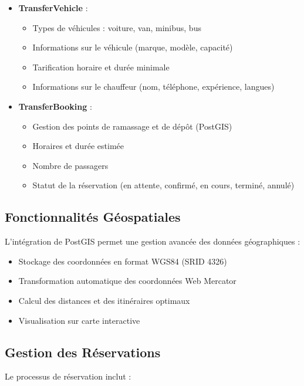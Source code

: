 \begin{itemize}
    \item \textbf{TransferVehicle} :
    \begin{itemize}
        \item Types de véhicules : voiture, van, minibus, bus
        \item Informations sur le véhicule (marque, modèle, capacité)
        \item Tarification horaire et durée minimale
        \item Informations sur le chauffeur (nom, téléphone, expérience, langues)
    \end{itemize}
    
    \item \textbf{TransferBooking} :
    \begin{itemize}
        \item Gestion des points de ramassage et de dépôt (PostGIS)
        \item Horaires et durée estimée
        \item Nombre de passagers
        \item Statut de la réservation (en attente, confirmé, en cours, terminé, annulé)
    \end{itemize}
\end{itemize}

\subsection{Fonctionnalités Géospatiales}
L'intégration de PostGIS permet une gestion avancée des données géographiques :

\begin{itemize}
    \item Stockage des coordonnées en format WGS84 (SRID 4326)
    \item Transformation automatique des coordonnées Web Mercator
    \item Calcul des distances et des itinéraires optimaux
    \item Visualisation sur carte interactive
\end{itemize}

\subsection{Gestion des Réservations}
Le processus de réservation inclut :

